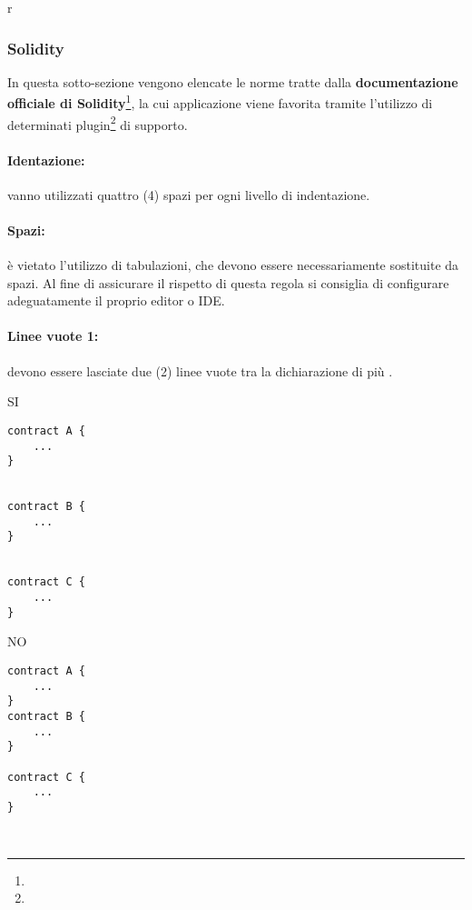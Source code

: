 r\documentclass[../ProcessiPrimari.tex]{subfiles}
\begin{document}
	
\subsubsection{Solidity}
In questa sotto-sezione vengono elencate le norme tratte dalla \textbf{documentazione officiale di Solidity}\footnote{}, la cui applicazione viene favorita tramite l'utilizzo di determinati plugin\footnote{} di supporto.
\paragraph*{Identazione: }
vanno utilizzati quattro (4) spazi per ogni livello di indentazione.
\paragraph*{Spazi: }
è vietato l'utilizzo di tabulazioni, che devono essere necessariamente sostituite da spazi. Al fine di assicurare il rispetto di questa regola si consiglia di configurare adeguatamente il proprio editor o IDE.
\paragraph*{Linee vuote 1: }
devono essere lasciate due (2) linee vuote tra la dichiarazione di più .
\begin{center}{
\begin{minipage}{6cm}
{\begin{center}SI\end{center}}
\begin{Verbatim}[frame=single]
contract A {
    ...
}


contract B {
    ...
}


contract C {
    ...
}
\end{Verbatim}
\end{minipage}
\hfil
\begin{minipage}{6cm}
{\begin{center}NO\end{center}}
\begin{Verbatim}[frame=single]
contract A {
    ...
}
contract B {
    ...
}

contract C {
    ...
}



\end{Verbatim}
\end{minipage}
}
\end{center}
\end{document}
